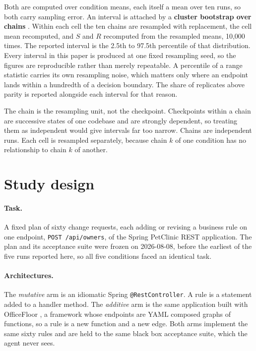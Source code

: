 \documentclass[11pt,a4paper]{article}
\begin{document}
Both are computed over condition means, each itself a mean over ten runs,
so both carry sampling error. An interval is attached by a \textbf{cluster
bootstrap over chains} \cite{davison1997, field2007}. Within each cell the ten
chains are resampled with replacement, the cell mean recomputed, and $S$ and $R$
recomputed from the resampled means, 10{,}000 times. The reported interval is the
2.5th to 97.5th percentile of that distribution. Every interval in this paper is
produced at one fixed resampling seed, so the figures are reproducible rather
than merely repeatable. A percentile
of a range statistic carries its own resampling noise, which matters only where
an endpoint lands within a hundredth of a decision boundary. The share of
replicates above parity is reported alongside each interval for that reason.

The chain is the resampling unit, not the checkpoint. Checkpoints within a chain
are successive states of one codebase and are strongly dependent, so treating
them as independent would give intervals far too narrow. Chains are independent
runs. Each cell is resampled separately, because chain $k$ of one condition has
no relationship to chain $k$ of another.

\section{Study design}

\paragraph{Task.} A fixed plan of sixty change requests, each adding or
revising a business rule on one endpoint, \texttt{POST /api/owners}, of the
Spring PetClinic REST application. The plan and its acceptance suite were
frozen on 2026-08-08, before the earliest of the five runs reported here, so
all five conditions faced an identical task.

\paragraph{Architectures.} The \emph{mutative} arm is an idiomatic Spring
\cite{spring} \texttt{@RestController}. A rule is a statement added to a
handler method. The \emph{additive} arm is the same application built with
OfficeFloor \cite{officefloor}, a framework whose endpoints are YAML composed
graphs of functions, so a rule is a new function and a new edge. Both arms
implement the same sixty rules and are held to the same
black box acceptance suite, which the agent never sees.
\end{document}
